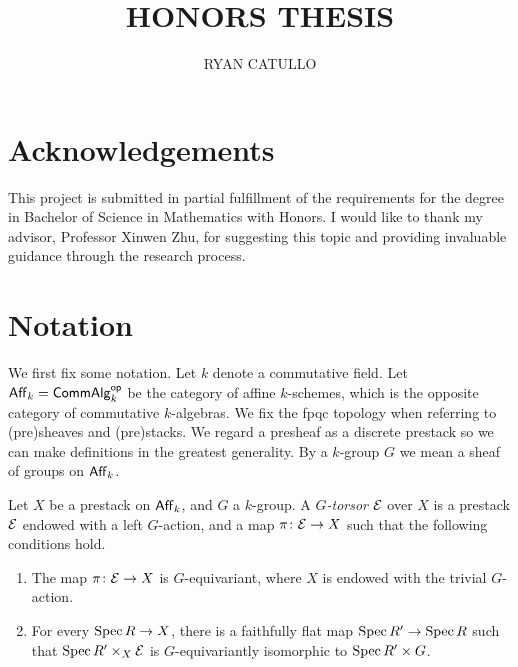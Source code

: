 \documentclass[12pt]{article}
\title{\large\bfseries{HONORS THESIS}}
\author{\normalsize{RYAN CATULLO}}
\date{}
\begin{document}
\maketitle
{}

\tableofcontents

\vspace{4em}
\pagestyle{fancy}

\section*{Acknowledgements}
This project is submitted in partial fulfillment of the requirements for the degree in Bachelor of Science in Mathematics with Honors. I would like to thank my advisor, Professor Xinwen Zhu, for suggesting this topic and providing invaluable guidance through the research process. 

\section{Notation}

We first fix some notation. Let $k$ denote a commutative field. Let $\operatorname{\mathsf{Aff}}_k = \operatorname{\mathsf{CommAlg}}_k^{\operatorname{\mathsf{op}}}$ be the category of affine $k$-schemes, which is the opposite category of commutative $k$-algebras. We fix the fpqc topology when referring to (pre)sheaves and (pre)stacks. We regard a presheaf as a discrete prestack so we can make definitions in the greatest generality. By a $k$-group $G$ we mean a sheaf of groups on $\operatorname{\mathsf{Aff}}_k$. 

\begin{defn}\label{gtorsor}
    Let $X$ be a prestack on $\operatorname{\mathsf{Aff}}_k$, and $G$ a $k$-group. A $G$\textit{-torsor} $\mathcal{E}$ over $X$ is a prestack $\mathcal{E}$ endowed with a left $G$-action, and a map $\pi \colon \mathcal{E} \to X$ such that the following conditions hold.
    \begin{enumerate}[label=(\roman*)]
        \item The map $\pi \colon \mathcal{E} \to X$ is $G$-equivariant, where $X$ is endowed with the trivial $G$-action.
        \item For every $\operatorname{Spec} R \to X$, there is a faithfully flat map $\operatorname{Spec} R' \to \operatorname{Spec} R$ such that $\operatorname{Spec} R' \times_X \mathcal{E}$ is $G$-equivariantly isomorphic to $\operatorname{Spec} R' \times G$.
    \end{enumerate}
\end{defn}
\end{document}
